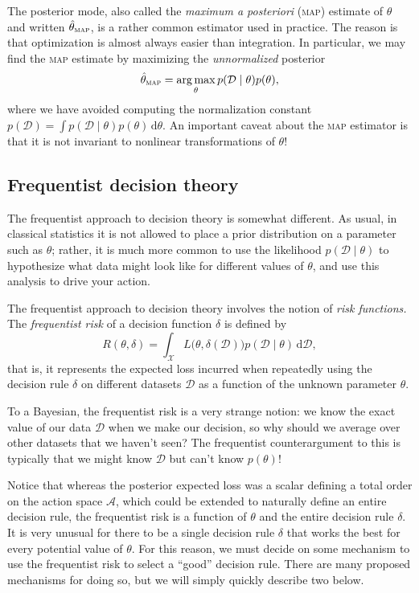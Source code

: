 \documentclass{article}
\newcommand{\acro}[1]{\textsc{\MakeLowercase{#1}}}
\newcommand{\given}{\mid}
\newcommand{\mc}[1]{\mathcal{#1}}
\newcommand{\data}{\mc{D}}
\newcommand{\intd}[1]{\,\mathrm{d}{#1}}
\DeclareMathOperator*{\argmax}{arg\,max}
\begin{document}
The posterior mode, also called the \emph{maximum a posteriori}
(\acro{MAP}) estimate of $\theta$ and written
$\hat{\theta}_{\text{\acro{MAP}}}$, is a rather common estimator used
in practice.  The reason is that optimization is almost always easier
than integration.  In particular, we may find the \acro{MAP} estimate
by maximizing the \emph{unnormalized} posterior
\begin{equation*}
  \hat{\theta}_{\text{\acro{MAP}}}
  =
  \argmax_\theta
  p(\data \given \theta)p(\theta),
\end{equation*}
where we have avoided computing the normalization constant $p(\data) =
\int p(\data \given \theta) p(\theta) \intd{\theta}.$ An important
caveat about the \acro{MAP} estimator is that it is not invariant to
nonlinear transformations of $\theta$!

\subsection*{Frequentist decision theory}

The frequentist approach to decision theory is somewhat different.  As
usual, in classical statistics it is not allowed to place a prior
distribution on a parameter such as $\theta$; rather, it is much more
common to use the likelihood $p(\data \given \theta)$ to hypothesize
what data might look like for different values of $\theta$, and use
this analysis to drive your action.

The frequentist approach to decision theory involves the notion of
\emph{risk functions.}  The \emph{frequentist risk} of a decision
function $\delta$ is defined by
\begin{equation*}
  R(\theta, \delta)
  =
  \int_{\mc{X}}
  L\bigl(\theta, \delta(\data)\bigr)
  p(\data \given \theta)
  \intd{\data},
\end{equation*}
that is, it represents the expected loss incurred when repeatedly
using the decision rule $\delta$ on different datasets $\data$ as a
function of the unknown parameter $\theta$.

To a Bayesian, the frequentist risk is a very strange notion: we know
the exact value of our data $\data$ when we make our decision, so why
should we average over other datasets that we haven't seen?  The
frequentist counterargument to this is typically that we might know
$\data$ but can't know $p(\theta)$!

Notice that whereas the posterior expected loss was a scalar defining
a total order on the action space $\mc{A}$, which could be extended to
naturally define an entire decision rule, the frequentist risk is a
function of $\theta$ and the entire decision rule $\delta$.  It is
very unusual for there to be a single decision rule $\delta$ that
works the best for every potential value of $\theta$.  For this
reason, we must decide on some mechanism to use the frequentist risk
to select a ``good'' decision rule.  There are many proposed
mechanisms for doing so, but we will simply quickly describe two
below.
\end{document}
